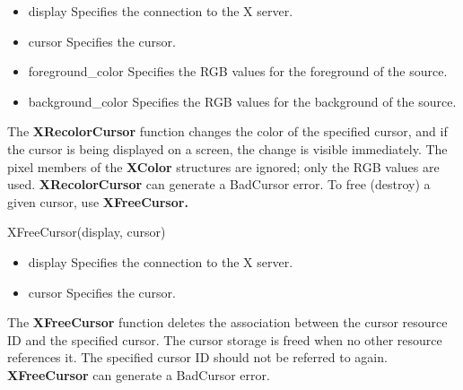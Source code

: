 \documentclass{report}
\begin{document}
\begin{itemize}
            \begin{itemize}
                \item display Specifies the connection to the X server.
                \item cursor Specifies the cursor.
                \item foreground\_color Specifies the RGB values for the foreground of the source.
                \item background\_color Specifies the RGB values for the background of the source.
            \end{itemize}
            The \textbf{XRecolorCursor} function changes the color of the specified cursor, and if the cursor is being displayed on a screen, the change is visible immediately. The pixel members of the \textbf{XColor} structures are ignored; only the RGB values are used.
            \bigbreak \noindent 
            \textbf{XRecolorCursor} can generate a BadCursor error.
            \bigbreak \noindent 
            To free (destroy) a given cursor, use \textbf{XFreeCursor.}
            \bigbreak \noindent 
            \begin{cppcode}
                XFreeCursor(display, cursor)
            \end{cppcode}
            \bigbreak \noindent
            \begin{itemize}
                \item display Specifies the connection to the X server.
                \item cursor Specifies the cursor.
            \end{itemize}
            The \textbf{XFreeCursor} function deletes the association between the cursor resource ID and the specified cursor. The cursor storage is freed when no other resource references it. The specified cursor ID should not be referred to again.
            \bigbreak \noindent 
            \textbf{XFreeCursor} can generate a BadCursor error.
    \end{itemize}
\end{document}
